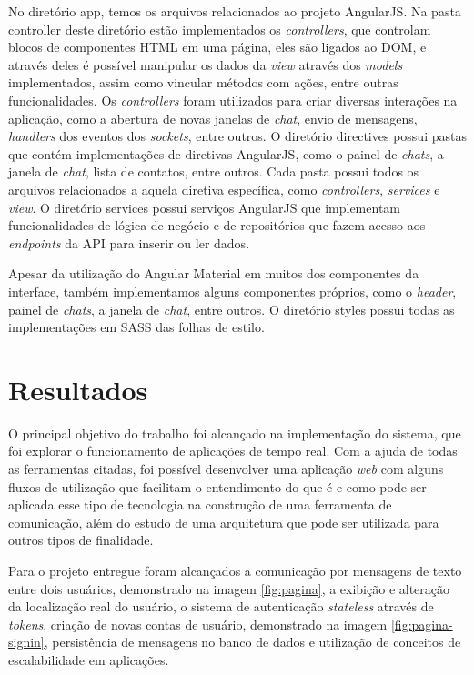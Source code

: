 No diretório app, temos os arquivos relacionados ao projeto AngularJS. Na pasta controller deste diretório estão implementados os \textit{controllers}, que controlam blocos de componentes HTML em uma página, eles são ligados ao DOM, e através deles é possível manipular os dados da \textit{view} através dos \textit{models} implementados, assim como vincular métodos com ações, entre outras funcionalidades. Os \textit{controllers} foram utilizados para criar diversas interações na aplicação, como a abertura de novas janelas de \textit{chat}, envio de mensagens, \textit{handlers} dos eventos dos \textit{sockets}, entre outros. O diretório directives possui pastas que contém implementações de diretivas AngularJS, como o painel de \textit{chats}, a janela de \textit{chat}, lista de contatos, entre outros. Cada pasta possui todos os arquivos relacionados a aquela diretiva específica, como \textit{controllers}, \textit{services} e \textit{view}. O diretório services possui serviços AngularJS que implementam funcionalidades de lógica de negócio e de repositórios que fazem acesso aos \textit{endpoints} da API para inserir ou ler dados.

Apesar da utilização do Angular Material em muitos dos componentes da interface, também implementamos alguns componentes próprios, como o \textit{header}, painel de \textit{chats}, a janela de \textit{chat}, entre outros. O diretório styles possui todas as implementações em SASS das folhas de estilo.

\section{Resultados}

O principal objetivo do trabalho foi alcançado na implementação do sistema, que foi explorar o funcionamento de aplicações de tempo real. Com a ajuda de todas as ferramentas citadas, foi possível desenvolver uma aplicação \textit{web} com alguns fluxos de utilização que facilitam o entendimento do que é e como pode ser aplicada esse tipo de tecnologia na construção de uma ferramenta de comunicação, além do estudo de uma arquitetura que pode ser utilizada para outros tipos de finalidade. 

Para o projeto entregue foram alcançados a comunicação por mensagens de texto entre dois usuários, demonstrado na imagem \ref{fig:pagina}, a exibição e alteração da localização real do usuário, o sistema de autenticação \textit{stateless} através de \textit{tokens}, criação de novas contas de usuário, demonstrado na imagem \ref{fig:pagina-signin}, persistência de mensagens no banco de dados e utilização de conceitos de escalabilidade em aplicações. 

